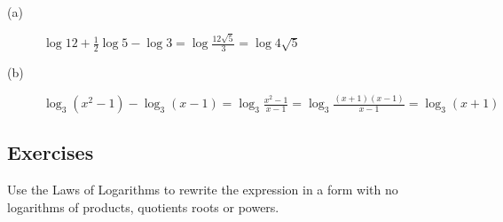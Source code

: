 \begin{description}
\item [(a)] $\log  12 +\frac{1}{2} \log  5 -\log  3 =\log  \frac{12 \sqrt{5}}{3} =\log  4 \sqrt{5}$ 

\item [(b)] $\log _{3} \left (x^{2} -1\right ) -\log _{3} \left (x -1\right ) =\log _{3} \frac{x^{2} -1}{x -1} =\log _{3} \frac{\left (x +1\right ) \left (x -1\right )}{x -1} =\log _{3} \left (x +1\right )$ \end{description}

\subsection{Exercises}
Use the Laws of Logarithms to rewrite the expression
in a form with no logarithms of products, quotients roots or powers. 


